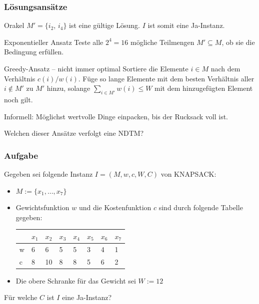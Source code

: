 \begin{frame}
\frametitle{Lösungsansätze}
\begin{block}{Orakel}
  $M' = \{i_2$, $i_4\}$ ist eine gültige Lösung. $I$ ist somit eine Ja-Instanz.
 \end{block}
\begin{block}{Exponentieller Ansatz}
 Teste alle $2^4 = 16$ mögliche Teilmengen $M' \subseteq M$, ob sie die Bedingung erfüllen. 
\end{block}
\begin{block}{Greedy-Ansatz -- nicht immer optimal}
 Sortiere die Elemente $i \in M$ nach dem Verhältnis $c(i)/w(i)$. 
 Füge so lange Elemente mit dem besten Verhältnis aller $i \not\in M'$ zu $M'$ hinzu, solange $\sum_{i \in M'} w(i) \leq W$ mit dem hinzugefügten Element noch gilt.
 
 Informell: Möglichst wertvolle Dinge einpacken, bis der Rucksack voll ist.
\end{block}
\pause
\begin{block}{}
 Welchen dieser Ansätze verfolgt eine NDTM?
\end{block}

\end{frame}





\begin{frame}
\frametitle{Aufgabe}
Gegeben sei folgende Instanz $I=(M, w, c, W, C)$ von KNAPSACK:

\begin{itemize}
\item $M := \{x_1, \ldots, x_7\}$
\item Gewichtsfunktion $w$ und die Kostenfunktion $c$ sind durch folgende Tabelle gegeben:

\begin{center}
\begin{tabular}{l|l|l|l|l|l|l|l}
	  &$x_1$ &$x_2$ &$x_3$ 	&$x_4$ 	&$x_5$ 	&$x_6$ 	&$x_7$\\ 	
  \hline
	w &6	 &6	&5	&5	&3	&4	&1\\
  \hline
	c &8	 &10	&8	&8	&5	&6	&2\\
\end{tabular}
\end{center}
\item Die obere Schranke für das Gewicht sei $W:=12$
\end{itemize}

Für welche $C$ ist $I$ eine Ja-Instanz?  
\end{frame}

